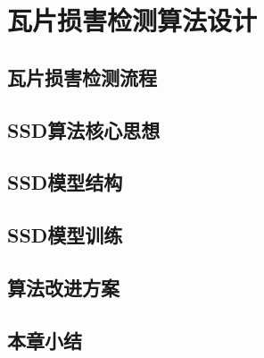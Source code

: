 \section{瓦片损害检测算法设计}
\setcounter{figure}{0}

\subsection{瓦片损害检测流程}

\subsection{SSD算法核心思想}

\subsection{SSD模型结构}

\subsection{SSD模型训练}

\subsection{算法改进方案}

\subsection{本章小结}
